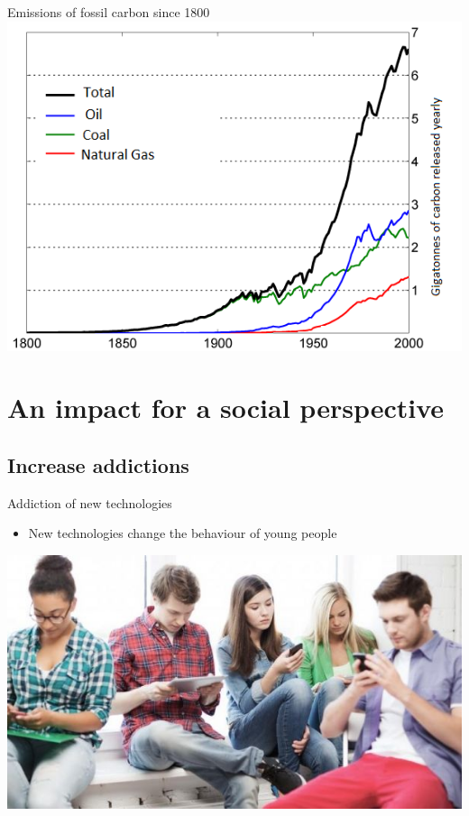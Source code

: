 \documentclass{beamer}
\begin{document}
 \begin{frame}
\begin{block}{Emissions of fossil carbon since 1800} 
	\hspace{4cm}
	\includegraphics[scale=0.6]{pics/image5.png}
\end{block}
\end{frame}


\section{An impact for a social perspective}

\subsection{Increase addictions}

 \begin{frame}
\begin{block}{Addiction of new technologies} 
	\begin{itemize}
		[circle]
		\item New technologies change the behaviour of young people
	\end{itemize}
	\includegraphics[scale=0.5]{pics/image6.jpg}
\end{block}
\end{frame}
\end{document}
